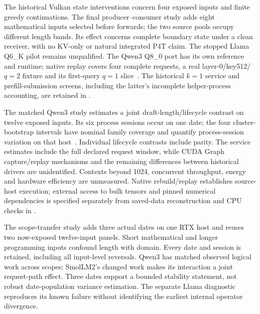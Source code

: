 The historical Vulkan state interventions concern four exposed inputs and finite greedy continuations. The final producer--consumer study adds eight mathematical inputs selected before forwards; the two source pools occupy different length bands. Its effect concerns complete boundary state under a clean receiver, with no KV-only or natural integrated P4T claim. The stopped Llama Q6\_K pilot remains unqualified. The Qwen3 Q8\_0 port has its own reference and runtime; native replay covers four complete requests, a real layer-0/key512/$q=2$ fixture and its first-query $q=1$ slice~\cite{b570nativereproduction}. The historical $k=1$ service and prefill-submission screens, including the latter's incomplete helper-process accounting, are retained in .

The matched Qwen3 study estimates a joint draft-length/lifecycle contrast on twelve exposed inputs. Its six process sessions occur on one date; the four cluster-bootstrap intervals have nominal family coverage and quantify process-session variation on that host~\cite{rtxnativebridge}. Individual lifecycle contrasts include parity. The service estimates include the full declared request window, while CUDA Graph capture/replay mechanisms and the remaining differences between historical drivers are unidentified. Contexts beyond 1024, concurrent throughput, energy and hardware efficiency are unmeasured. Native rebuild/replay establishes source-host execution; external access to bulk tensors and pinned numerical dependencies is specified separately from saved-data reconstruction and CPU checks in .


The scope-transfer study adds three actual dates on one RTX host and reuses two now-exposed twelve-input panels. Short mathematical and longer programming inputs confound length with domain. Every date and session is retained, including all input-level reversals. Qwen3 has matched observed logical work across scopes; SmolLM2's changed work makes its interaction a joint request-path effect. Three dates support a bounded stability statement, not robust date-population variance estimation. The separate Llama diagnostic reproduces its known failure without identifying the earliest internal operator divergence.
